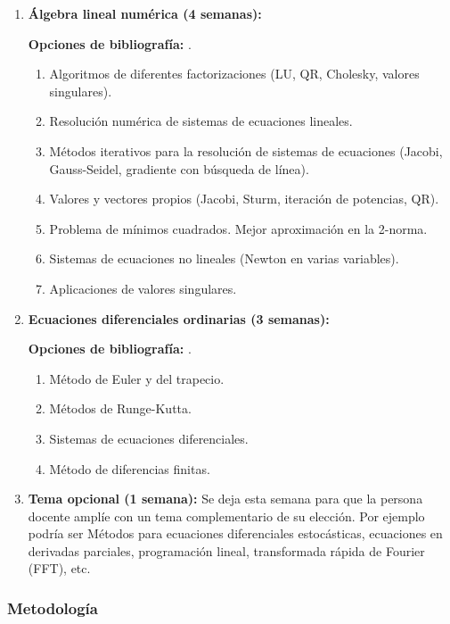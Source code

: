 \begin{refsection}
\begin{enumerate}
\item \textbf{Álgebra lineal numérica (4 semanas):}

\textbf{Opciones de bibliografía:} \cite{trefethen97}.

\begin{enumerate}
	\item Algoritmos de diferentes factorizaciones (LU, QR, Cholesky, valores singulares).
	\item Resolución numérica de sistemas de ecuaciones lineales.
	\item Métodos iterativos para la resolución de sistemas de ecuaciones (Jacobi, Gauss-Seidel, gradiente con búsqueda de línea).
\item Valores y vectores propios (Jacobi, Sturm, iteración de potencias, QR).
	\item Problema de mínimos cuadrados. Mejor aproximación en la 2-norma.
	\item Sistemas de ecuaciones no lineales (Newton en varias variables).
	\item Aplicaciones de valores singulares.
\end{enumerate}
	
\item \textbf{Ecuaciones diferenciales ordinarias (3 semanas):}

\textbf{Opciones de bibliografía:} \cite{Quarteroni,Suli2003}.

\begin{enumerate}
	\item Método de Euler y del trapecio.
	\item Métodos de Runge-Kutta.
	\item Sistemas de ecuaciones diferenciales.
	\item Método de diferencias finitas.
\end{enumerate}

\item \textbf{Tema opcional (1 semana):}   Se deja esta semana para que la persona docente amplíe con un tema complementario de su elección. Por ejemplo podría ser Métodos para ecuaciones diferenciales estocásticas, ecuaciones en derivadas parciales, programación lineal, transformada rápida de Fourier (FFT), etc.
\nocite{Zhang}

\end{enumerate}


\subsubsection*{Metodología}


\end{refsection}
